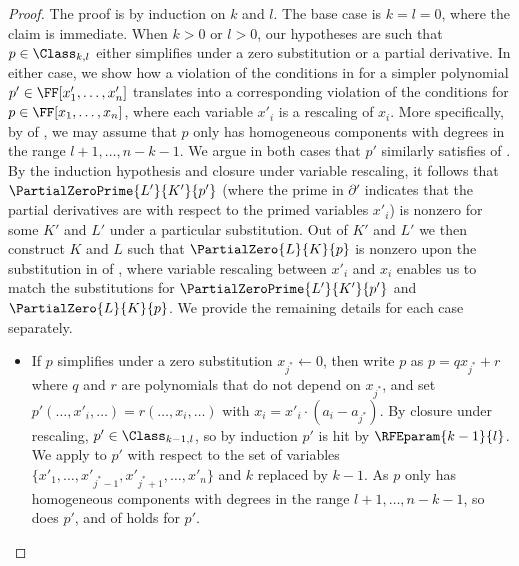 \documentclass{toc}
\begin{document}
\begin{proof}
  The proof is by induction on \(k\) and \(l\).
  The base case is \(k=l=0\), where the claim is immediate.
  When \(k>0\) or \(l > 0\), our hypotheses are such that $p \in \Class_{k,l}$ either simplifies under a zero substitution
  or a partial derivative. In either case, we show how a violation of the conditions in  for a simpler polynomial $p' \in \FF[x'_1,\dots,x'_n]$ translates into a corresponding violation of the conditions for $p \in \FF[x_1,\dots,x_n]$, where each variable $x'_i$ is a rescaling of $x_i$. More specifically, by  of
  , we may assume that $p$ only has homogeneous components with degrees in the range
  $l+1,\ldots,n-k-1$. We argue in both cases that $p'$ similarly satisfies  of
  . By the induction hypothesis and closure under variable rescaling, it follows that $\PartialZeroPrime{L'}{K'}{p'}$ (where the prime in $\partial'$ indicates that the partial derivatives are with respect to the primed variables $x'_i$) is nonzero for some $K'$ and $L'$ under a particular substitution. Out of $K'$ and $L'$ we then construct $K$ and $L$ such that $\PartialZero{L}{K}{p}$ is nonzero upon the substitution in  of
  , where variable rescaling between $x'_i$ and $x_i$ enables us to match the substitutions for $\PartialZeroPrime{L'}{K'}{p'}$ and $\PartialZero{L}{K}{p}$. We provide the remaining details for each case separately.
  \begin{itemize}
    \item
      If $p$ simplifies under a zero substitution $x_{j^*}\gets 0$, then
      write $p$ as $p = q x_{j^*} + r$ where $q$ and $r$ are
      polynomials that do not depend on $x_{j^*}$,
      and set $p'(\dots,x'_i,\dots)=r(\dots,x_i,\dots)$ with $x_i=x'_i \cdot (a_i-a_{j^*})$.
      By closure under rescaling, $p'\in \Class_{k-1,l}$, so by induction $p'$ is hit by \(\RFEparam{k-1}{l}\).
      We apply  to $p'$ with respect to the set of variables \(\{x'_1,\ldots,x'_{j^*-1},x'_{j^*+1},\ldots,x'_n\}\) and $k$ replaced by $k-1$.
      As $p$ only has homogeneous components with degrees in the range $l+1,\ldots,n-k-1$, so does $p'$,
      and  of
       holds for $p'$.

\end{itemize}
\end{proof}
\end{document}
